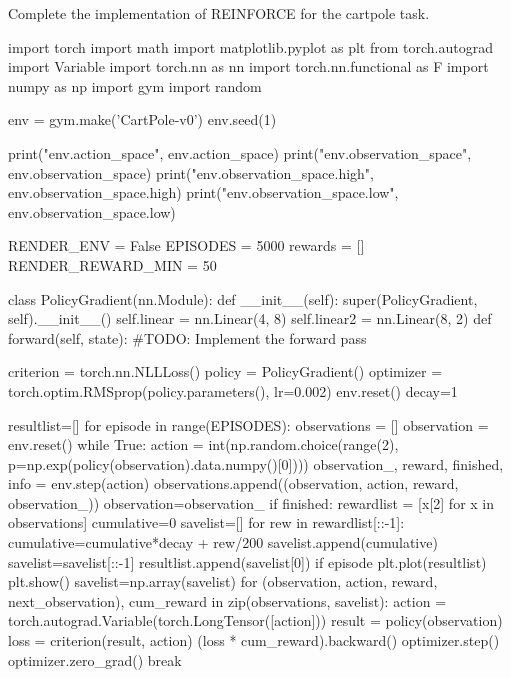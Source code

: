 \begin{exercise}
Complete the implementation of REINFORCE for the cartpole task.
\begin{python}
import torch
import math
import matplotlib.pyplot as plt
from torch.autograd import Variable
import torch.nn as nn
import torch.nn.functional as F
import numpy as np
import gym
import random

env = gym.make('CartPole-v0')
env.seed(1)

print("env.action_space", env.action_space)
print("env.observation_space", env.observation_space)
print("env.observation_space.high", env.observation_space.high)
print("env.observation_space.low", env.observation_space.low)


RENDER_ENV = False
EPISODES = 5000
rewards = []
RENDER_REWARD_MIN = 50

class PolicyGradient(nn.Module):
    def __init__(self):
        super(PolicyGradient, self).__init__()
        self.linear = nn.Linear(4, 8)
        self.linear2 = nn.Linear(8, 2)
    def forward(self, state):
        #TODO: Implement the forward pass
    
criterion = torch.nn.NLLLoss()
policy = PolicyGradient()
optimizer = torch.optim.RMSprop(policy.parameters(), lr=0.002)
env.reset()
decay=1

resultlist=[]
for episode in range(EPISODES):
    observations = []
    observation = env.reset()
    while True:
        action = int(np.random.choice(range(2), p=np.exp(policy(observation).data.numpy()[0])))
        observation_, reward, finished, info = env.step(action)
        observations.append((observation, action, reward, observation_))
        observation=observation_
        if finished:
            rewardlist = [x[2] for x in observations]
            cumulative=0
            savelist=[]
            for rew in rewardlist[::-1]:
                cumulative=cumulative*decay + rew/200
                savelist.append(cumulative)
            savelist=savelist[::-1]
            resultlist.append(savelist[0])
            if episode%
                plt.plot(resultlist)
                plt.show()
            savelist=np.array(savelist)
            for (observation, action, reward, next_observation), cum_reward in zip(observations, savelist):
                action = torch.autograd.Variable(torch.LongTensor([action]))
                result = policy(observation)
                loss = criterion(result, action)
                (loss * cum_reward).backward()
                optimizer.step()
                optimizer.zero_grad()
            break
\end{python}
\end{exercise}



